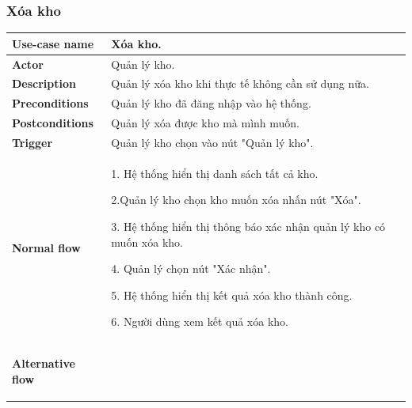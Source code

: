         \subsubsection{Xóa kho}
        {
\setlength\extrarowheight{6pt}
            \begin{longtable}{| p{} | p{} |} 
                \hline
                 \textbf{Use-case name} 
                & 
                Xóa kho.
                \\
                \hline
                \textbf{Actor} 
                & 
                Quản lý kho.
                \\
                \hline
                \textbf{Description} 
                & 
                Quản lý xóa kho khi thực tế không cần sử dụng nữa.
                \\
                \hline
                 \textbf{Preconditions} 
                &
                Quản lý kho đã đăng nhập vào hệ thống.
                \\
                \hline
                \textbf{Postconditions} 
                & 
                Quản lý xóa được kho mà mình muốn.
                \\
                \hline
                \textbf{Trigger} 
                & 
                Quản lý kho chọn vào nút "Quản lý kho".
                \\
                \hline
                \begin{flushleft}
                 \textbf{Normal flow}
                \end{flushleft}
                & 
                1. Hệ thống hiển thị danh sách tất cả kho.
                    
                    2.Quản lý kho chọn kho muốn xóa nhấn nút "Xóa".
                    
                    3. Hệ thống hiển thị thông báo xác nhận quản lý kho có muốn xóa kho.
                    
                    4. Quản lý chọn nút "Xác nhận".
                    
                    5. Hệ thống hiển thị kết quả xóa kho thành công.
                    
                    6. Người dùng xem kết quả xóa kho.
                \\
                \hline
                \begin{flushleft}
                    \textbf{Alternative flow}
                    

\end{flushleft}
\end{longtable}}
